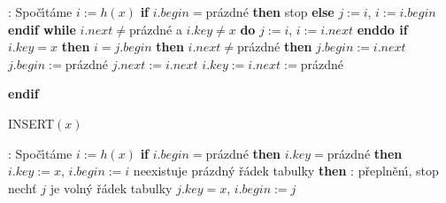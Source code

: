 :\newline 
Spo\v c\'\i t\'ame $i:=h\left(x\right)$\newline 
{\bf if} $i.begin=$pr\'azdn\'e {\bf then} stop {\bf else} $j:=i$, $
i:=i.begin$ {\bf endif\newline 
while} $i.next\ne$pr\'azdn\'e a $i.key\ne x$ {\bf do} $j:=i$, $i:=i.next$ {\bf enddo \newline 
if} $i.key=x$ {\bf then}\newline 
\phantom{---}{\bf if} $i=j.begin$ {\bf then}\newline 
\phantom{------}{\bf if} $i.next\ne$pr\'azdn\'e {\bf then}\newline 
\phantom{---------}$j.begin:=i.next$\newline 
\phantom{------}{\bf else}\newline 
\phantom{---------}$j.begin:=$pr\'azdn\'e\newline 
\phantom{------}{\bf endif}\newline 
\phantom{---}{\bf else}\newline 
\phantom{------}$j.next:=i.next$\newline 
\phantom{---}{\bf endif}\newline 
\phantom{---}$i.key:=i.next:=$pr\'azdn\'e\newline
{\bf endif
\medskip

\flushpar INSERT$\left(x\right)$}:\newline 
Spo\v c\'\i t\'ame $i:=h\left(x\right)$\newline
{\bf if} $i.begin=$pr\'azdn\'e {\bf then}\newline
\phantom{---}{\bf if} $i.key=$pr\'azdn\'e {\bf then}\newline 
\phantom{------}$i.key:=x$, $i.begin:=i$\newline 
\phantom{---}{\bf else}\newline 
\phantom{------}{\bf if} neexistuje pr\'azdn\'y \v r\'adek tabulky {\bf then}\newline 
\phantom{---------}{\bf V\'ystup}: p\v repln\v en\'\i , stop\newline 
\phantom{------}{\bf else}\newline 
\phantom{---------}nech\v t $j$ je voln\'y \v r\'adek tabulky\newline 
\phantom{---------}$j.key=x$, $i.begin:=j$\newline 
\phantom{------}{\bf endif}\newline
\phantom{---}{\bf endif\newline 
else}\newline
